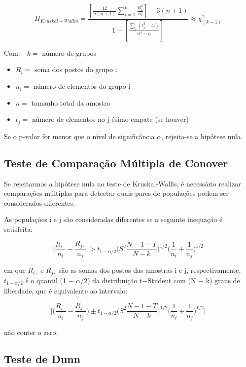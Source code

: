 \documentclass[
]{estat/estat}
\begin{document}
\[
H_{Kruskal-Wallis}=
    \displaystyle\frac{\displaystyle\left[ \frac{12}{n(n+1)} \sum_{i=1}^{k} \frac{R_i^2}{n_i} \right] - 3(n+1)}
    {\displaystyle1- \left[ \frac{\displaystyle\sum_{j}^{}(t_j^3 - t_j)}{n^3 - n}\right]} 
\approx \chi^2_{(k-1)}
\]

Com: - \(k=\) número de grupos

\begin{itemize}
\item
  \(R_i=\) soma dos postos do grupo i
\item
  \(n_i=\) número de elementos do grupo i
\item
  \(n=\) tamanho total da amostra
\item
  \(t_{j}=\) número de elementos no j-ésimo empate (se houver)
\end{itemize}

Se o p-valor for menor que o nível de significância \(\alpha\),
rejeita-se a hipótese nula.

\hypertarget{teste-de-comparauxe7uxe3o-muxfaltipla-de-conover}{%
\subsection{Teste de Comparação Múltipla de
Conover}\label{teste-de-comparauxe7uxe3o-muxfaltipla-de-conover}}

Se rejeitarmos a hipótese nula no teste de Kruskal-Wallis, é necessário
realizar comparações múltiplas para detectar quais pares de populações
podem ser considerados diferentes.

As populações i e j são consideradas diferentes se a seguinte inequação
é satisfeita:

\[\bigg | \frac{R_{i\cdot}}{n_i} - \frac{R_{j\cdot}}{n_j} \bigg | > t_{1-\alpha/2} \bigg ( S^2 \frac{N-1-T}{N-k} \bigg ) ^{1/2} \bigg ( \frac{1}{n_i} + \frac{1}{n_j} \bigg )^{1/2}\]

em que \(R_{i\cdot}\) e \(R_{j\cdot}\) são as somas dos postos das
amostras i e j, respectivamente, \(t_{1−\alpha/2}\) é o quantil (1 −
\(\alpha\)/2) da distribuição t−Student com (N − k) graus de liberdade,
que é equivalente ao intervalo:

\[\bigg [ \bigg ( \frac{R_{i\cdot}}{n_i} - \frac{R_{j\cdot}}{n_j} \bigg )   \pm t_{1-\alpha/2} \bigg ( S^2 \frac{N-1-T}{N-k} \bigg ) ^{1/2} \bigg ( \frac{1}{n_i} + \frac{1}{n_j} \bigg )^{1/2} \bigg ]\]

não conter o zero.

\hypertarget{teste-de-dunn}{%
\subsection{Teste de Dunn}\label{teste-de-dunn}}
\end{document}
